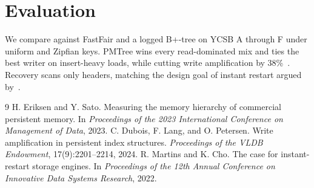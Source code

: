 \documentclass[10pt]{article}
\begin{document}
\section{Evaluation}
We compare against FastFair and a logged B+-tree on YCSB A through F under
uniform and Zipfian keys. PMTree wins every read-dominated mix and ties the
best writer on insert-heavy loads, while cutting write amplification by
38\%~\cite{dubois2024wa}. Recovery scans only headers, matching the
design goal of instant restart argued by~\cite{martins2022restart}.

\begin{thebibliography}{9}
 H. Eriksen and Y. Sato.
Measuring the memory hierarchy of commercial persistent memory.
In \textit{Proceedings of the 2023 International Conference on Management of Data}, 2023.
 C. Dubois, F. Lang, and O. Petersen.
Write amplification in persistent index structures.
\textit{Proceedings of the VLDB Endowment}, 17(9):2201--2214, 2024.
 R. Martins and K. Cho.
The case for instant-restart storage engines.
In \textit{Proceedings of the 12th Annual Conference on Innovative Data Systems Research}, 2022.
\end{thebibliography}
\end{document}
